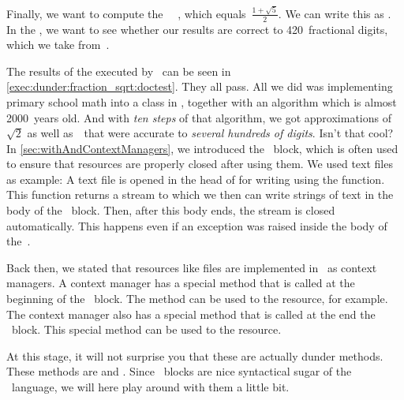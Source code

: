 Finally, we want to compute the ~\numberGoldenRatio~\cite{CEOEB2024GR,EHF2008EEOGTGOJLH11FEEEELIEILHIATBG11EAPWMETBFR,S2024DEOGRPOT}, which equals~$\frac{1+\sqrt{5}}{2}$.
We can write this as .
In the , we want to see whether our results are correct to 420~fractional digits, which we take from~\cite{F1996TGR1T2P}.

The results of the  executed by \pytest\ can be seen in \cref{exec:dunder:fraction_sqrt:doctest}.
They all pass.
All we did was implementing primary school math into a class in \python, together with an algorithm which is almost 2000~years old.
And with \emph{ten steps} of that algorithm, we got approximations of~$\sqrt{2}$ as well as~\numberGoldenRatio\ that were accurate to \emph{several hundreds of digits}.
Isn't that cool?%
%
\FloatBarrier%
\endhsection%
%
%
\label{sec:dunder:contextManager}%
%
In \cref{sec:withAndContextManagers}, we introduced the ~block, which is often used to ensure that resources are properly closed after using them.
We used text files as example:
A text file is opened in the head of  for writing using the  function.
This function returns a stream to which we then can write strings of text in the body of the ~block.
Then, after this body ends, the stream is closed automatically.
This happens even if an exception was raised inside the body of the~.

Back then, we stated that resources like files are implemented in \python\ as context managers.
A context manager has a special method that is called at the beginning of the ~block.
The method can be used to  the resource, for example.
The context manager also has a special method that is called at the end the ~block.
This special method can be used to  the resource.

At this stage, it will not surprise you that these  are actually dunder methods.
These methods are  and .
Since ~blocks are nice syntactical sugar of the \python\ language, we will here play around with them a little bit.

